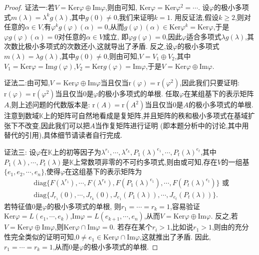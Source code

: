 \documentclass[../../main.tex]{subfiles}
\begin{document}
\begin{proof}
{\color{blue}证法一:}若$V=\mathrm{Ker}\varphi\oplus\mathrm{Im}\varphi$,则由可知, $\mathrm{Ker}\varphi=\mathrm{Ker}\varphi^2=\cdots$. 设$\varphi$的极小多项式$m(\lambda)=\lambda^kg(\lambda)$,其中$g(0)\neq 0$,我们来证明$k = 1$. 用反证法,假设$k\geqslant 2$,则对任意的$\alpha\in V$,有$\varphi^kg(\varphi)(\alpha)=0$,从而$g(\varphi)(\alpha)\in\mathrm{Ker}\varphi^k=\mathrm{Ker}\varphi$,于是$\varphi g(\varphi)(\alpha)=0$对任意的$\alpha\in V$成立, 即$\varphi g(\varphi)=0$,因此$\varphi$适合多项式$\lambda g(\lambda)$,其次数比极小多项式的次数还小,这就导出了矛盾. 反之,设$\varphi$的极小多项式$m(\lambda)=\lambda g(\lambda)$,其中$g(0)\neq 0$,则由可知,$V = V_1\oplus V_2$,其中$V_1=\mathrm{Ker}\varphi=\mathrm{Im}g(\varphi)$,$V_2=\mathrm{Ker}g(\varphi)=\mathrm{Im}\varphi$,于是$V=\mathrm{Ker}\varphi\oplus\mathrm{Im}\varphi$.

{\color{blue}证法二:}由可知,$V=\mathrm{Ker}\varphi\oplus\mathrm{Im}\varphi$当且仅当$\mathrm{r}(\varphi)=\mathrm{r}(\varphi^2)$,因此我们只要证明: $\mathrm{r}(\varphi)=\mathrm{r}(\varphi^2)$当且仅当$0$是$\varphi$的极小多项式的单根. 任取$\varphi$在某组基下的表示矩阵$A$,则上述问题的代数版本是: $\mathrm{r}(A)=\mathrm{r}(A^2)$当且仅当$0$是$A$的极小多项式的单根. 注意到数域$\mathbb{K}$上的矩阵可自然地看成是复矩阵,并且矩阵的秩和极小多项式在基域扩张下不改变,因此我们可以把$A$当作复矩阵进行证明 (即本题分析中的讨论,其中用替代的引用),具体细节请读者自行完成.

{\color{blue}证法三:}
设$\varphi$在$\mathbb{K}$上的初等因子为$\lambda^{r_1},\cdots,\lambda^{r_k},P_1(\lambda)^{e_1},\cdots,P_t(\lambda)^{e_t}$,其中$P_1(\lambda),\cdots,P_t(\lambda)$是$\mathbb{K}$上常数项非零的不可约多项式,则由或可知,存在$V$的一组基$\{e_1,e_2,\cdots,e_n\}$,使得$\varphi$在这组基下的表示矩阵为
\begin{align*}
&\mathrm{diag}\{F(\lambda^{r_1}),\cdots,F(\lambda^{r_k}),F(P_1(\lambda)^{e_1}),\cdots,F(P_t(\lambda)^{e_t})\}\text{ 或 }\\
&\mathrm{diag}\{J_{r_1}(0),\cdots,J_{r_k}(0),J_{e_1}(P_1(\lambda)),\cdots,J_{e_t}(P_t(\lambda))\}.
\end{align*}
若特征值$0$是$\varphi$的极小多项式的单根, 则$r_1 = \cdots = r_k = 1$,容易验证$\mathrm{Ker}\varphi = L(e_1,\cdots,e_k)$,$\mathrm{Im}\varphi = L(e_{k + 1},\cdots,e_n)$,从而$V = \mathrm{Ker}\varphi\oplus\mathrm{Im}\varphi$. 反之,若$V = \mathrm{Ker}\varphi\oplus\mathrm{Im}\varphi$,则$\mathrm{Ker}\varphi\cap\mathrm{Im}\varphi = 0$. 若存在某个$r_i > 1$,比如说$r_1 > 1$,则由的充分性完全类似的证明可知,$0\neq e_1\in\mathrm{Ker}\varphi\cap\mathrm{Im}\varphi$,这就推出了矛盾. 因此,$r_1 = \cdots = r_k = 1$,从而$0$是$\varphi$的极小多项式的单根. 
\end{proof}
\end{document}
